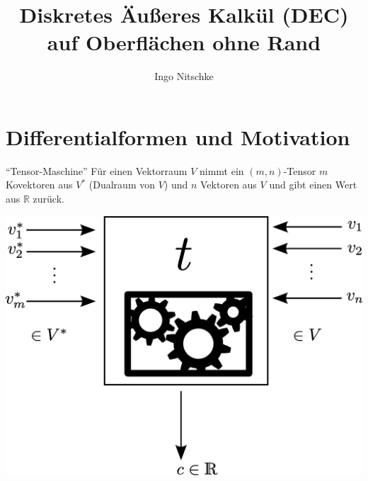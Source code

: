 \documentclass{beamer}
\title[DEC]{Diskretes Äußeres Kalkül (DEC)\\auf Oberflächen ohne Rand}
\author{Ingo Nitschke}
\institute{IWR - TU Dresden}
\newcommand{\R}{\mathds{R}}
\begin{document}
 \frame{ \titlepage }

  
\section{Differentialformen und Motivation}

  \begin{frame}
    \begin{block}{"`Tensor-Maschine"'}
      Für einen Vektorraum \( V \) nimmt ein \( (m,n) \)-Tensor \( m \) Kovektoren aus \( V^{*} \)
      (Dualraum von \( V \)) und \( n \) Vektoren aus \( V \) und gibt einen Wert aus \( \R \) zurück.

      \hfill\includegraphics[height=0.7\textheight]{bilder/tensormaschine/Tensor.eps}\phantom{qwertz}
    \end{block}
  \end{frame}
\end{document}
